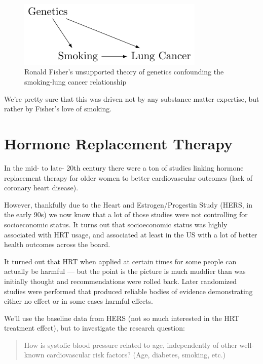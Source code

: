 \documentclass[
  letterpaper,
  DIV=11,
  numbers=noendperiod]{scrreport}
\begin{document}
\begin{figure}

{\centering \includegraphics[width=3.5in,height=\textheight]{week1/standalone_figures/confounding/smoking_confounding.svg}

}

\caption{Ronald Fisher's unsupported theory of genetics confounding the
smoking-lung cancer relationship}

\end{figure}

We're pretty sure that this was driven not by any substance matter
expertise, but rather by Fisher's love of smoking.

\hypertarget{hormone-replacement-therapy}{%
\section{Hormone Replacement
Therapy}\label{hormone-replacement-therapy}}

In the mid- to late- 20th century there were a ton of studies linking
hormone replacement therapy for older women to better cardiovascular
outcomes (lack of coronary heart disease).

However, thankfully due to the Heart and Estrogen/Progestin Study (HERS,
in the early 90s) we now know that a lot of those studies were not
controlling for socioeconomic status. It turns out that socioeconomic
status was highly associated with HRT usage, and associated at least in
the US with a lot of better health outcomes across the board.

It turned out that HRT when applied at certain times for some people can
actually be harmful --- but the point is the picture is much muddier
than was initially thought and recommendations were rolled back. Later
randomized studies were performed that produced reliable bodies of
evidence demonstrating either no effect or in some cases harmful
effects.

We'll use the baseline data from HERS (not so much interested in the HRT
treatment effect), but to investigate the research question:

\begin{quote}
How is systolic blood pressure related to age, independently of other
well-known cardiovascular risk factors? (Age, diabetes, smoking, etc.)
\end{quote}
\end{document}
